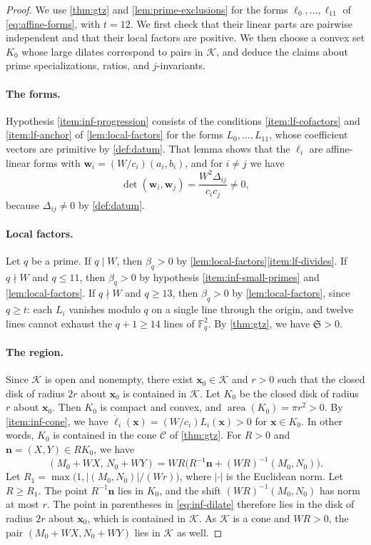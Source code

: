 \documentclass[12pt,oneside,openany]{book}
\theoremstyle{definition}
\theoremstyle{plain}
\numberwithin{equation}{chapter}
\theoremstyle{plain}
\theoremstyle{definition}
\theoremstyle{remark}
\newcommand{\F}{\mathbb F}
\DeclareMathOperator{\area}{area}
\newcommand{\cK}{\mathcal K}
\begin{document}
\begin{proof}
We use \cref{thm:gtz} and \cref{lem:prime-exclusions} for the forms $\ell_0,\dots,\ell_{11}$ of \eqref{eq:affine-forms}, with $t=12$. We first check that their linear parts are pairwise independent and that their local factors are positive. We then choose a convex set $K_0$ whose large dilates correspond to pairs in $\cK$, and deduce the claims about prime specializations, ratios, and $j$-invariants.

\paragraph{The forms.} Hypothesis \ref{item:inf-progression} consists of the conditions \ref{item:lf-cofactors} and \ref{item:lf-anchor} of \cref{lem:local-factors} for the forms $L_0,\dots,L_{11}$, whose coefficient vectors are primitive by \cref{def:datum}. That lemma shows that the $\ell_i$ are affine-linear forms with $\mathbf w_i=(W/c_i)(a_i,b_i)$, and for $i\ne j$ we have
\[
\det(\mathbf w_i,\mathbf w_j)=\frac{W^2\Delta_{ij}}{c_ic_j}\ne0,
\]
because $\Delta_{ij}\ne0$ by \cref{def:datum}.

\paragraph{Local factors.} Let $q$ be a prime. If $q\mid W$, then $\beta_q>0$ by \cref{lem:local-factors}\ref{item:lf-divides}. If $q\nmid W$ and $q\le11$, then $\beta_q>0$ by hypothesis \ref{item:inf-small-primes} and \cref{lem:local-factors}. If $q\nmid W$ and $q\ge13$, then $\beta_q>0$ by \cref{lem:local-factors}, since $q\ge t$: each $L_i$ vanishes modulo $q$ on a single line through the origin, and twelve lines cannot exhaust the $q+1\ge14$ lines of $\F_q^2$. By \cref{thm:gtz}, we have $\mathfrak S>0$.

\paragraph{The region.} Since $\cK$ is open and nonempty, there exist $\mathbf x_0\in\cK$ and $r>0$ such that the closed disk of radius $2r$ about $\mathbf x_0$ is contained in $\cK$. Let $K_0$ be the closed disk of radius $r$ about $\mathbf x_0$. Then $K_0$ is compact and convex, and $\area(K_0)=\pi r^2>0$. By \ref{item:inf-cone}, we have $\dot\ell_i(\mathbf x)=(W/c_i)L_i(\mathbf x)>0$ for $\mathbf x\in K_0$. In other words, $K_0$ is contained in the cone $\mathcal C$ of \cref{thm:gtz}. For $R>0$ and $\mathbf n=(X,Y)\in RK_0$, we have
\begin{equation}\label{eq:inf-dilate}
(M_0+WX,\,N_0+WY)=WR\Big(R^{-1}\mathbf n+(WR)^{-1}(M_0,N_0)\Big).
\end{equation}
Let $R_1=\max\big(1,|(M_0,N_0)|/(Wr)\big)$, where $|\cdot|$ is the Euclidean norm. Let $R\ge R_1$. The point $R^{-1}\mathbf n$ lies in $K_0$, and the shift $(WR)^{-1}(M_0,N_0)$ has norm at most $r$. The point in parentheses in \eqref{eq:inf-dilate} therefore lies in the disk of radius $2r$ about $\mathbf x_0$, which is contained in $\cK$. As $\cK$ is a cone and $WR>0$, the pair $(M_0+WX,N_0+WY)$ lies in $\cK$ as well.


\end{proof}
\end{document}
